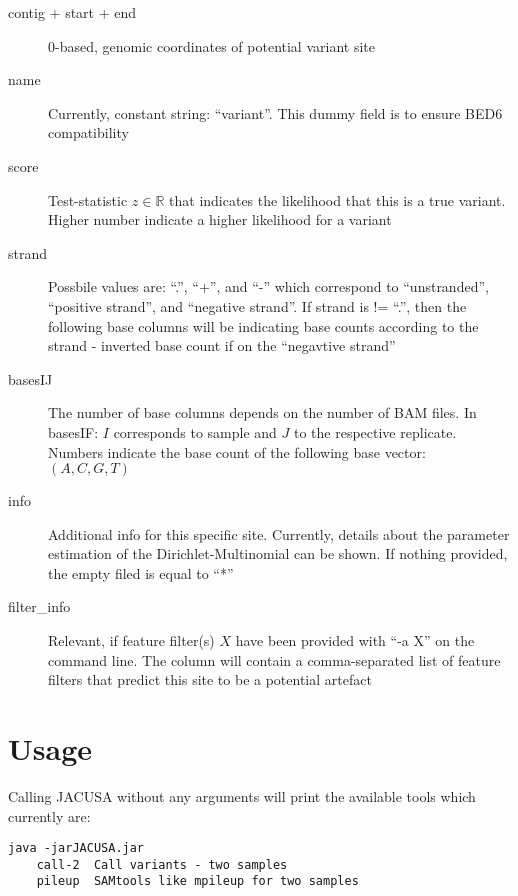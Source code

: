 \documentclass[12pt, a4paper]{article}
\begin{document}
\begin{description}
\item[contig + start + end] 0-based, genomic coordinates of potential variant site
\item[name] Currently, constant string: ``variant''. This dummy field is to ensure BED6
compatibility
\item[score] Test-statistic $z \in \mathbb{R}$ that indicates the likelihood that this is a true
variant. Higher number indicate a higher likelihood for a variant
\item[strand] Possbile values are: ``.'', ``+'', and ``-'' which correspond to ``unstranded'',
``positive strand'', and ``negative strand''. If strand is != ``.'', then the following base columns
will be indicating base counts according to the strand - inverted base count if on the ``negavtive
strand''
\item[basesIJ] The number of base columns depends on the number of BAM files. In basesIF: $I$
corresponds to sample and $J$ to the respective replicate. Numbers indicate the base count of the
following base vector: $(A, C, G, T)$
\item[info] Additional info for this specific site. Currently, details about the parameter
estimation of the Dirichlet-Multinomial can be shown. If nothing provided, the empty filed is equal
to ``*''
\item[filter\_info] Relevant, if feature filter(s) $X$ have been provided with ``-a X'' on the
command line. The column will contain a comma-separated list of feature filters that predict this
site to be a potential artefact
\end{description}
\section{Usage}
Calling JACUSA without any arguments will print the available tools which currently are:
\begin{verbatim}
java -jarJACUSA.jar
	call-2  Call variants - two samples
    pileup  SAMtools like mpileup for two samples
\end{verbatim}
\end{document}
